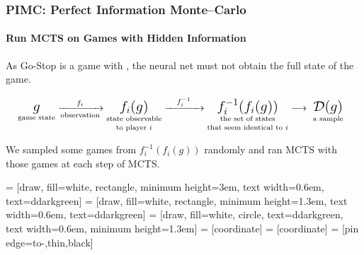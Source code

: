 \begin{frame}[fragile]
  \frametitle{PIMC: Perfect Information Monte--Carlo}
  \framesubtitle{Run MCTS on Games with Hidden Information}

  As Go-Stop is a game with , the neural net must not obtain the full state of the game.

  $$ \hskip-7pt {\mathop{\text{\Large $g$}}\limits_{\text{game state}}} \xrightarrow[\text{observation}]{\quad f_{i}\quad} {\mathop{\text{\Large $f_i(g)$}}\limits_{\substack{\text{state observable}\\[0.3em]\text{to player $i$}}}} \xrightarrow{\quad f_i^{-1}\quad} {\mathop{\text{\Large $f^{-1}_i(f_i(g))$}}\limits_{\substack{\text{the set of states}\\[0.3em]\text{that seem identical to $i$}}}}\longrightarrow \ {\mathop{\text{\Large $\mathcal D(g)$}}\limits_{\text{a sample}}} $$

  \vspace{1em}

  We sampled some games from $f_i^{-1}(f_i(g))$ randomly and ran MCTS with those games at each step of MCTS.
\end{frame}

 = [draw, fill=white, rectangle, 
    minimum height=3em, text width=0.6em, text=ddarkgreen]
 = [draw, fill=white, rectangle, 
    minimum height=1.3em, text width=0.6em, text=ddarkgreen]
 = [draw, fill=white, circle, text=ddarkgreen, text width=0.6em, minimum height=1.3em]
 = [coordinate]
 = [coordinate]
 = [pin edge={to-,thin,black}]

